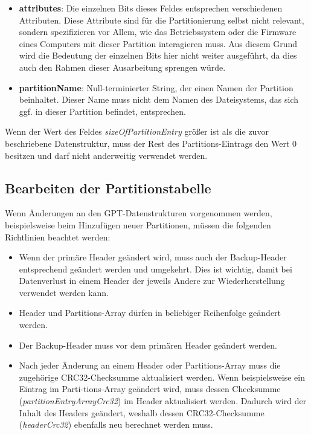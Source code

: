\begin{itemize}
    \newpage
    \item \textbf{attributes}:
    Die einzelnen Bits dieses Feldes entsprechen verschiedenen Attributen.
    Diese Attribute sind für die Partitionierung selbst nicht relevant, sondern spezifizieren vor Allem, wie das Betriebssystem oder die Firmware eines Computers mit dieser Partition interagieren muss.
    Aus diesem Grund wird die Bedeutung der einzelnen Bits hier nicht weiter ausgeführt, da dies auch den Rahmen dieser Ausarbeitung sprengen würde.
    
    \item \textbf{partitionName}:
    Null-terminierter String, der einen Namen der Partition beinhaltet.
    Dieser Name muss nicht dem Namen des Dateisystems, das sich ggf. in dieser Partition befindet, entsprechen.

\end{itemize}

Wenn der Wert des Feldes \textit{sizeOfPartitionEntry} größer ist als die zuvor beschriebene Datenstruktur, muss der Rest des Partitions-Eintrags den Wert 0 besitzen und darf nicht anderweitig verwendet werden.\cite{uefi-spec}

\subsection{Bearbeiten der Partitionstabelle}
Wenn Änderungen an den GPT-Datenstrukturen vorgenommen werden, beispielsweise beim Hinzufügen neuer Partitionen, müssen die folgenden Richtlinien beachtet werden:

\begin{itemize}
    \item Wenn der primäre Header geändert wird, muss auch der Backup-Header entsprechend geändert werden und umgekehrt.
    Dies ist wichtig, damit bei Datenverlust in einem Header der jeweils Andere zur Wiederherstellung verwendet werden kann.

    \item Header und Partitions-Array dürfen in beliebiger Reihenfolge geändert werden.
    
    \item Der Backup-Header muss vor dem primären Header geändert werden.

    \item Nach jeder Änderung an einem Header oder Partitions-Array muss die zugehörige CRC32-Checksumme aktualisiert werden.
    Wenn beispielsweise ein Eintrag im Parti-tions-Array geändert wird, muss dessen Checksumme (\textit{partitionEntryArrayCrc32}) im Header aktualisiert werden.
    Dadurch wird der Inhalt des Headers geändert, weshalb dessen CRC32-Checksumme (\textit{headerCrc32}) ebenfalls neu berechnet werden muss.
\end{itemize}

